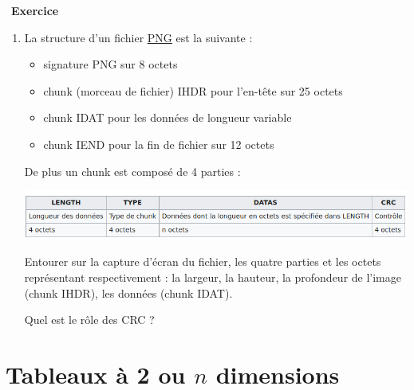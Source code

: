 \documentclass[a4paper, french, 12pt]{article}
\newcounter{exo}
\newenvironment{exercice}[1]
{\par \medskip   \addtocounter{exo}{1} \noindent  
\begin{bclogo}[arrondi =0.1,   noborder = true, logo=\bccrayon, marge=4]{~\textbf{Exercice} \textbf{\theexo} {\itshape #1} }  \par}
{
\end{bclogo}
 \par \bigskip }
\begin{document}
\begin{exercice}{}
\begin{enumerate}
\begin{enumerate}
\item La structure d'un fichier \href{https://fr.wikipedia.org/wiki/Portable_Network_Graphics}{PNG} est la suivante :

\begin{itemize}
	\item signature PNG sur 8 octets
     \item chunk (morceau de fichier) IHDR pour l'en-tête sur  25 octets
     \item chunk IDAT pour les données de longueur variable
     \item chunk IEND pour la fin de fichier sur 12 octets
 \end{itemize}

De plus un chunk est composé de 4 parties :

\begin{center}
\includegraphics[scale=0.55]{images/chunk-png.png}
\end{center}


Entourer sur la capture d'écran  du fichier, les quatre parties  et les octets représentant respectivement : la largeur, la hauteur, la profondeur de l'image (chunk IHDR), les données (chunk IDAT).

Quel est le rôle des CRC ?


\end{enumerate}
\end{enumerate}



\end{exercice}



\section{Tableaux à 2 ou $n$ dimensions}

\vspace*{-20pt}
\end{document}
